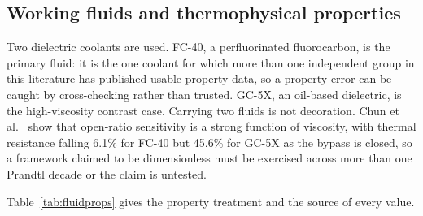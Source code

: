 \subsection{Working fluids and thermophysical properties}
\label{sec:properties}

Two dielectric coolants are used. FC-40, a perfluorinated fluorocarbon, is the primary fluid: it is
the one coolant for which more than one independent group in this literature has published usable
property data, so a property error can be caught by cross-checking rather than trusted. GC-5X, an
oil-based dielectric, is the high-viscosity contrast case. Carrying two fluids is not decoration.
Chun et al.~\cite{chun2026} show that open-ratio sensitivity is a strong function of viscosity,
with thermal resistance falling 6.1\% for FC-40 but 45.6\% for GC-5X as the bypass is closed, so a
framework claimed to be dimensionless must be exercised across more than one Prandtl decade or the
claim is untested.

Table~\ref{tab:fluidprops} gives the property treatment and the source of every value.

